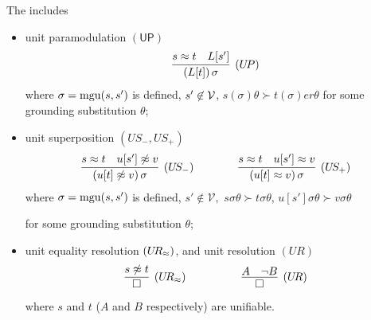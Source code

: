 
\begin{definition}\label{def:unit-superpositin-calculus}
	The  includes
	\begin{itemize}
		\item unit paramodulation \( \mathsf{(UP)} \)
		\begin{gather*}
		\infer
		[(U\!P)]
		{(L[t])\,\sigma}
		{s\mEQ t&L[s']}
		\end{gather*}
		where \( \sigma=\operatorname{mgu}(s,s') \) is defined,
		\( s'\not\in\mathcal{V} \),
		\( s(\sigma)\theta\succ t(\sigma)er\theta \)
		for some grounding substitution \( \theta \);

		\item unit superposition \( (U\!S_-,U\!S_+) \)
		\begin{gather*}
		\infer
		[(U\!S_-)]
		{(u[t]\mNE v)\,\sigma}
		{s\mEQ t&u[s']\mNE v}
		\qquad\qquad
		\infer
		[(U\!S_+)]
		{(u[t]\mEQ v)\,\sigma}
		{s\mEQ t&u[s']\mEQ v}
		\end{gather*}
		where \( \sigma=\operatorname{mgu}(s,s') \) is defined,
		\( s'\not\in\mathcal{V}, \)
		\( s\sigma\theta\succ t\sigma\theta \),
		\( u[s']\sigma\theta\succ v\sigma\theta \)

		for some grounding substitution \( \theta \);
		\item unit equality resolution \( (U\!R_\approx) \), and unit resolution \( (U\!R) \)
		\begin{gather*}
		\infer
		[(U\!R_\mEQ)]
		{\emptyclause}
		{s\mNE t}
		\quad\quad\quad\qquad
		\infer
		[(U\!R)]
		{\emptyclause}
		{A&\lnot B}
		\end{gather*}
		where \( s \) and \( t \) (\( A \) and \( B \) respectively) are unifiable.
	\end{itemize}
\end{definition}